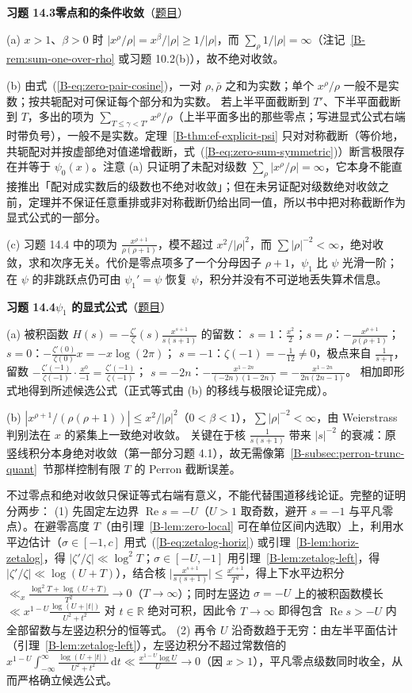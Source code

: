 \documentclass[11pt,a4paper]{article}
\newcommand{\RR}{\mathbb{R}}
\newcommand{\dd}{\,\mathrm{d}}
\renewcommand{\Re}{\operatorname{Re}}
\newcommand{\bref}[1]{\ref*{B-#1}}
\newcommand{\Sol}[2]{%
  \par\addvspace{1.2em}\noindent
  \hypertarget{s:#1}{}\textbf{习题 #1\quad #2}\hfill{\small（\hyperlink{q:#1}{题目}）}\par
  \nopagebreak\smallskip}
\begin{document}
\Sol{14.3}{零点和的条件收敛}
(a) $x>1$、$\beta>0$ 时 $|x^\rho/\rho|=x^\beta/|\rho|\ge1/|\rho|$，而 $\sum_\rho1/|\rho|=\infty$（注记~\bref{rem:sum-one-over-rho} 或习题 10.2(b)），故不绝对收敛。

(b) 由式~(\bref{eq:zero-pair-cosine})，一对 $\rho,\bar\rho$ 之和为实数；单个 $x^\rho/\rho$ 一般不是实数；按共轭配对可保证每个部分和为实数。
若上半平面截断到 $T'$、下半平面截断到 $T$，多出的项为 $\sum_{T\le\gamma<T'}x^{\rho}/\rho$（上半平面多出的那些零点；写进显式公式右端时带负号），一般不是实数。定理~\bref{thm:ef-explicit-psi} 只对对称截断（等价地，共轭配对并按虚部绝对值递增截断，式~(\bref{eq:zero-sum-symmetric})）断言极限存在并等于 $\psi_0(x)$。注意 (a) 只证明了未配对级数 $\sum_\rho|x^\rho/\rho|=\infty$，它本身不能直接推出「配对成实数后的级数也不绝对收敛」；但在未另证配对级数绝对收敛之前，定理并不保证任意重排或非对称截断仍给出同一值，所以书中把对称截断作为显式公式的一部分。

(c) 习题 14.4 中的项为 $\frac{x^{\rho+1}}{\rho(\rho+1)}$，模不超过 $x^2/|\rho|^2$，而 $\sum|\rho|^{-2}<\infty$，绝对收敛，求和次序无关。代价是零点项多了一个分母因子 $\rho+1$，$\psi_1$ 比 $\psi$ 光滑一阶；在 $\psi$ 的非跳跃点仍可由 $\psi_1'=\psi$ 恢复 $\psi$，积分并没有不可逆地丢失算术信息。

\Sol{14.4}{$\psi_1$ 的显式公式}
(a) 被积函数 $H(s)=-\frac{\zeta'}{\zeta}(s)\frac{x^{s+1}}{s(s+1)}$ 的留数：
$s=1$：$\frac{x^2}{2}$；$s=\rho$：$-\frac{x^{\rho+1}}{\rho(\rho+1)}$；
$s=0$：$-\frac{\zeta'(0)}{\zeta(0)}x=-x\log(2\pi)$；
$s=-1$：$\zeta(-1)=-\frac1{12}\neq0$，极点来自 $\frac1{s+1}$，留数 $-\frac{\zeta'(-1)}{\zeta(-1)}\cdot\frac{x^0}{-1}=\frac{\zeta'(-1)}{\zeta(-1)}$；
$s=-2n$：$-\frac{x^{1-2n}}{(-2n)(1-2n)}=-\frac{x^{1-2n}}{2n(2n-1)}$。
相加即形式地得到所述候选公式（正式等式由 (b) 的移线与极限论证完成）。

(b) $|x^{\rho+1}/(\rho(\rho+1))|\le x^2/|\rho|^2$（$0<\beta<1$），$\sum|\rho|^{-2}<\infty$，由 Weierstrass 判别法在 $x$ 的紧集上一致绝对收敛。
关键在于核 $\frac1{s(s+1)}$ 带来 $|s|^{-2}$ 的衰减：原竖线积分本身绝对收敛（第一部分习题 4.1），故无需像第~\bref{subsec:perron-trunc-quant}~节那样控制有限 $T$ 的 Perron 截断误差。

不过零点和绝对收敛只保证等式右端有意义，不能代替围道移线论证。完整的证明分两步：
(1) 先固定左边界 $\Re s=-U$（$U>1$ 取奇数，避开 $s=-1$ 与平凡零点）。在避零高度 $T$（由引理~\bref{lem:zero-local} 可在单位区间内选取）上，利用水平边估计（$\sigma\in[-1,c]$ 用式~(\bref{eq:zetalog-horiz}) 或引理~\bref{lem:horiz-zetalog}，得 $|\zeta'/\zeta|\ll\log^2T$；$\sigma\in[-U,-1]$ 用引理~\bref{lem:zetalog-left}，得 $|\zeta'/\zeta|\ll\log(U+T)$），结合核 $\bigl|\frac{x^{s+1}}{s(s+1)}\bigr|\le\frac{x^{c+1}}{T^2}$，得上下水平边积分 $\ll_x\frac{\log^2T+\log(U+T)}{T^2}\to0$（$T\to\infty$）；同时左竖边 $\sigma=-U$ 上的被积函数模长 $\ll x^{1-U}\frac{\log(U+|t|)}{U^2+t^2}$ 对 $t\in\RR$ 绝对可积，因此令 $T\to\infty$ 即得包含 $\Re s>-U$ 内全部留数与左竖边积分的恒等式。
(2) 再令 $U$ 沿奇数趋于无穷：由左半平面估计（引理~\bref{lem:zetalog-left}），左竖边积分不超过常数倍的
$x^{1-U}\int_{-\infty}^\infty\frac{\log(U+|t|)}{U^2+t^2}\dd t\ll\frac{x^{1-U}\log U}{U}\to0$（因 $x>1$），平凡零点级数同时收全，从而严格确立候选公式。
\end{document}
